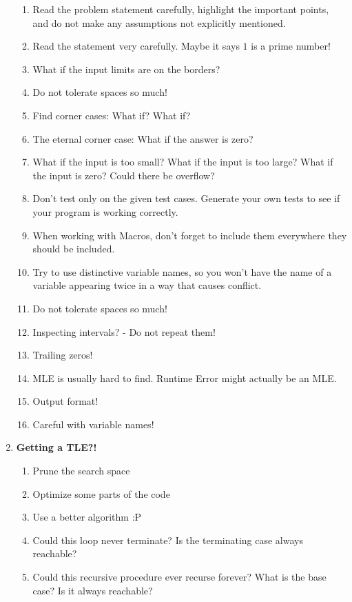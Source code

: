 \documentclass[12pt]{book}
\begin{document}
\begin{enumerate}
\begin{enumerate}[label = \roman*.]
\item Read the problem statement carefully, highlight the important points, and do not make any assumptions not explicitly mentioned.
\item Read the statement very carefully. Maybe it says $1$ is a prime number!
\item What if the input limits are on the borders?
\item Do not tolerate spaces so much!
\item Find corner cases: What if? What if?
\item The eternal corner case: What if the answer is zero?
\item What if the input is too small? What if the input is too large? What if the input is zero? Could there be overflow?
\item Don't test only on the given test cases. Generate your own tests to see if your program is working correctly.
\item When working with Macros, don't forget to include them everywhere they should be included.
\item Try to use distinctive variable names, so you won't have the name of a variable appearing twice in a way that causes conflict.\item Do not tolerate spaces so much!
\item Inspecting intervals? - Do not repeat them!
\item Trailing zeros!
\item MLE is usually hard to find. Runtime Error might actually be an MLE.
\item Output format!
\item Careful with variable names!
\end{enumerate}

\item
\textbf{Getting a TLE?!}
\begin{enumerate}[label = \roman*.]
\item Prune the search space
\item Optimize some parts of the code
\item Use a better algorithm :P
\item Could this loop never terminate? Is the terminating case always reachable?
\item Could this recursive procedure ever recurse forever? What is the base case? Is it always reachable?
\end{enumerate}


\end{enumerate}
\end{document}
